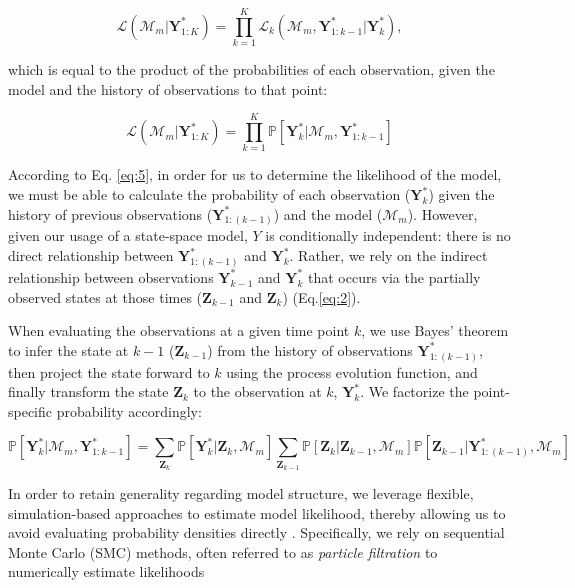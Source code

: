 \documentclass{article}
\begin{document}
\begin{equation}
\label{eq:4}
\mathcal{L}(\mathcal{M}_m|\textbf{Y}^{*}_{1:K}) = \prod_{k = 1}^{K}{\mathcal{L}_k(\mathcal{M}_m, \textbf{Y}^{*}_{1:k-1}|\textbf{Y}^{*}_{k})},
\end{equation}

which is equal to the product of the probabilities of each observation, given the model and the history of observations to that point:

\begin{equation}
\label{eq:5}
\mathcal{L}(\mathcal{M}_m|\textbf{Y}^{*}_{1:K}) = \prod_{k = 1}^{K}{\mathbb{P}[\textbf{Y}^{*}_{k}|\mathcal{M}_m, \textbf{Y}^{*}_{1:k-1}]}
\end{equation}

According to Eq. \ref{eq:5}, in order for us to determine the likelihood of the model, we must be able to calculate the probability of each observation ($\textbf{Y}^{*}_{k}$) given the history of previous observations ($\textbf{Y}^{*}_{1:(k-1)}$) and the model ($\mathcal{M}_m$). However, given our usage of a state-space model, $Y$ is conditionally independent: there is no direct relationship between $\textbf{Y}^{*}_{1:(k-1)}$ and $\textbf{Y}^{*}_{k}$. Rather, we rely on the indirect relationship between  observations $\textbf{Y}^{*}_{k-1}$ and $\textbf{Y}^{*}_{k}$ that occurs via the partially observed states at those times ($\textbf{Z}_{k-1}$ and $\textbf{Z}_{k}$) (Eq.\ref{eq:2}). 

When evaluating the observations at a given time point $k$, we use Bayes' theorem  to infer the state at $k-1$ ($\textbf{Z}_{k-1}$) from the history of observations $\textbf{Y}^{*}_{1:(k-1)}$, then project the state forward to $k$ using the process evolution function, and finally transform the state $\textbf{Z}_{k}$ to the observation at $k$, $\textbf{Y}^{*}_{k}$. We factorize the point-specific probability accordingly:

\begin{equation}
\label{eq:6}
\mathbb{P}[\textbf{Y}^{*}_{k}|\mathcal{M}_m, \textbf{Y}^{*}_{1:k-1}] = \sum_{\textbf{Z}_k}{\mathbb{P}[\textbf{Y}^*_k|\textbf{Z}_k, \mathcal{M}_m]}\sum_{\textbf{Z}_{k-1}}{\mathbb{P}[\textbf{Z}_k|\textbf{Z}_{k-1}, \mathcal{M}_m]\mathbb{P}[\textbf{Z}_{k-1}|\textbf{Y}^*_{1:(k-1)}, \mathcal{M}_m]}
\end{equation}

In order to retain generality regarding model structure, we leverage flexible, simulation-based approaches to estimate model likelihood, thereby allowing us to avoid evaluating probability densities directly \citep{Breto2009, He2010, Ionides2015}. Specifically, we rely on sequential Monte Carlo (SMC) methods, often referred to as \emph{particle filtration} to numerically estimate likelihoods \citep{Kitagawa1987, Doucet2001, Ionides2006}
\end{document}
